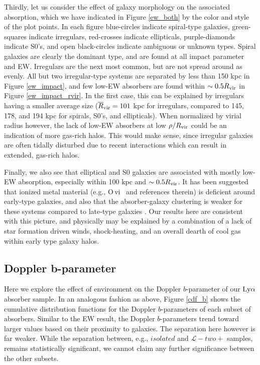 \documentclass[twocolumn,tighten]{aastex62}
\newcommand{\VI}{\,{\sc vi}}
\begin{document}
Thirdly, let us consider the effect of galaxy morphology on the associated absorption, which we have indicated in Figure \ref{ew_both} by the color and style of the plot points. In each figure blue-circles indicate spiral-type galaxies, green-squares indicate irregulars, red-crosses indicate ellipticals, purple-diamonds indicate S0's, and open black-circles indicate ambiguous or unknown types. Spiral galaxies are clearly the dominant type, and are found at all impact parameter and EW. Irregulars are the next most common, but are not spread around as evenly. All but two irregular-type systems are separated by less than 150 kpc in Figure \ref{ew_impact}, and few low-EW absorbers are found within $\sim 0.5 R_{\rm vir}$ in Figure \ref{ew_impact_rvir}. In the first case, this can be explained by irregulars having a smaller average size ($\overline{R}_{\rm vir} = 101$ kpc for irregulars, compared to 145, 178, and 194 kpc for spirals, S0's, and ellipticals). When normalized by virial radius however, the lack of low-EW absorbers at low $\rho / R_{\rm vir}$ could be an indication of more gas-rich halos. This would make sense, since irregular galaxies are often tidally disturbed due to recent interactions which can result in extended, gas-rich halos.

Finally, we also see that elliptical and S0 galaxies are associated with mostly low-EW absorption, especially within 100 kpc and $\sim 0.5 R_{\rm vir}$. It has been suggested that ionized metal material (e.g., O\VI~\citealt{tumlinson2011} and references therein) is deficient around early-type galaxies, and also that the absorber-galaxy clustering is weaker for these systems compared to late-type galaxies \cite{chen2005}. Our results here are consistent with this picture, and physically may be explained by a combination of a lack of star formation driven winds, shock-heating, and an overall dearth of cool gas within early type galaxy halos.


\subsection{Doppler b-parameter}

Here we explore the effect of environment on the Doppler $b$-parameter of our $\rm Ly\alpha$ absorber sample. In an analogous fashion as above, Figure \ref{cdf_b} shows the cumulative distribution functions for the Doppler $b$-parameters of each subset of absorbers. Similar to the EW result, the Doppler $b$-parameters trend toward larger values based on their proximity to galaxies. The separation here however is far weaker. While the separation between, e.g., $isolated$ and $\mathcal{L}-two+$ samples, remains statistically significant, we cannot claim any further significance between the other subsets. 
\end{document}
